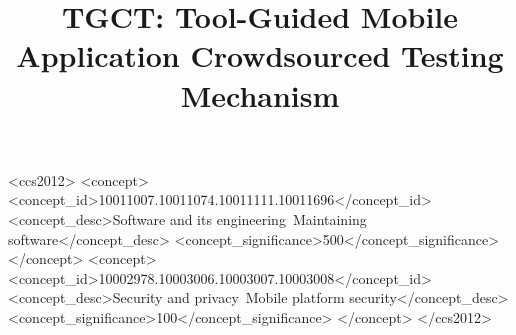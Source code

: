 \documentclass[sigconf,review,anonymous]{acmart}
\begin{document}
%
\title{TGCT: Tool-Guided Mobile Application Crowdsourced Testing Mechanism}

%


%
%
\begin{CCSXML}
<ccs2012>
<concept>
<concept_id>10011007.10011074.10011111.10011696</concept_id>
<concept_desc>Software and its engineering~Maintaining software</concept_desc>
<concept_significance>500</concept_significance>
</concept>
<concept>
<concept_id>10002978.10003006.10003007.10003008</concept_id>
<concept_desc>Security and privacy~Mobile platform security</concept_desc>
<concept_significance>100</concept_significance>
</concept>
</ccs2012>
\end{CCSXML}

%
\maketitle
%

%







%


\end{document}
